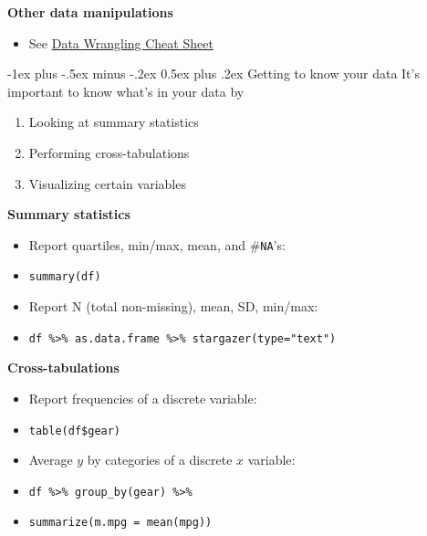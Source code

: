 \documentclass[10pt,landscape]{article}
\makeatletter
\renewcommand{\section}{\@startsection{section}{1}{0mm}%
                                {-1ex plus -.5ex minus -.2ex}%
                                {0.5ex plus .2ex}%
                                {\normalfont\large\bfseries}}
\makeatother
\begin{document}
\begin{multicols}{3}
\smallskip{}

\textbf{Other data manipulations}\\
\begin{itemize}
    \item See \href{https://www.rstudio.com/wp-content/uploads/2015/02/data-wrangling-cheatsheet.pdf}{Data Wrangling Cheat Sheet}
\end{itemize}

\section{Getting to know your data}
It's important to know what's in your data by
\begin{enumerate}
    \item Looking at summary statistics
    \item Performing cross-tabulations
    \item Visualizing certain variables
\end{enumerate}

\smallskip{}

\textbf{Summary statistics}\\
\begin{itemize}
    \item Report quartiles, min/max, mean, and \#\verb!NA!'s:
    \item[] \verb!summary(df)!
    \item Report N (total non-missing), mean, SD, min/max:
    \item[] \verb!df %>% as.data.frame %>% stargazer(type="text")!
\end{itemize}

\smallskip{}

\textbf{Cross-tabulations}\\
\begin{itemize}
    \item Report frequencies of a discrete variable:
    \item[] \verb!table(df$gear)!
    \item Average $y$ by categories of a discrete $x$ variable:
    \item[] \verb!df %>% group_by(gear) %>% !
    \item[] \verb!summarize(m.mpg = mean(mpg))!
\end{itemize}

\smallskip{}


\end{multicols}
\end{document}
